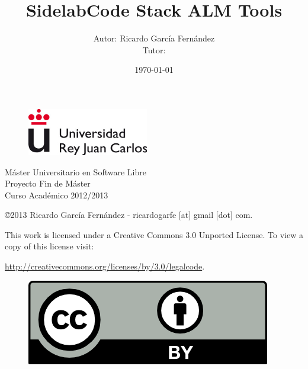 \documentclass[11pt]{scrartcl}
\title{\textbf{SidelabCode Stack ALM Tools}}
\author{Autor: Ricardo Garc\'ia Fern\'andez
\\Tutor: }
\date{\today}
\begin{document}
\maketitle

\vspace{2cm}

\begin{figure}[h]
    \begin{center}
        \includegraphics{urjc}
        \label{fig:by}
    \end{center}
\end{figure}

\begin{center}
\large
M\'aster Universitario en Software Libre
\\ Proyecto Fin de M\'aster
\\Curso Acad\'emico 2012/2013
\end{center}

\vfill

\begin{flushright}
    \copyright  2013 Ricardo Garc\'ia Fern\'andez - ricardogarfe [at] gmail [dot] com.

    This work is licensed under a Creative Commons 3.0 Unported License.
    To view a copy of this license visit:
 
    \url{http://creativecommons.org/licenses/by/3.0/legalcode}.
\end{flushright}

\begin{figure}[h]
    \begin{flushright}	
        \includegraphics{by}
        \label{fig:by}
    \end{flushright}
\end{figure}

\newpage

\end{document}
